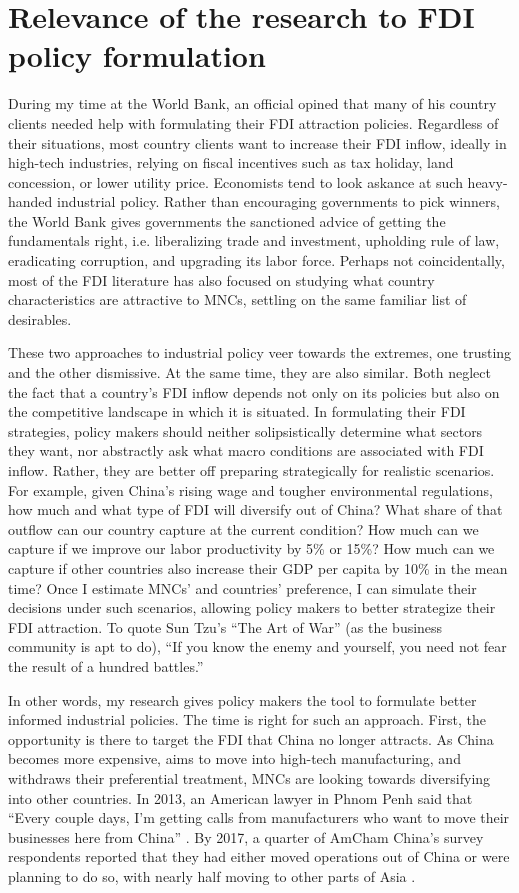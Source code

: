 \section{Relevance of the research to FDI policy formulation}

During my time at the World Bank, an official opined that many of his country
clients needed help with formulating their FDI attraction policies. Regardless
of their situations, most country clients want to increase their FDI inflow,
ideally in high-tech industries, relying on fiscal incentives such as tax
holiday, land concession, or lower utility price. Economists tend to look
askance at such heavy-handed industrial policy. Rather than encouraging
governments to pick winners, the World Bank gives governments the sanctioned
advice of getting the fundamentals right, i.e. liberalizing trade and
investment, upholding rule of law, eradicating corruption, and upgrading its
labor force. Perhaps not coincidentally, most of the FDI literature has also
focused on studying what country characteristics are attractive to MNCs,
settling on the same familiar list of desirables.

These two approaches to industrial policy veer towards the extremes, one
trusting and the other dismissive. At the same time, they are also similar. Both
neglect the fact that a country's FDI inflow depends not only on its policies
but also on the competitive landscape in which it is situated. In formulating their
FDI strategies, policy makers should neither solipsistically determine what
sectors they want, nor abstractly ask what macro conditions are associated with
FDI inflow. Rather, they are better off preparing strategically for realistic
scenarios. For example, given China's rising wage and tougher environmental
regulations, how much and what type of FDI will diversify out of China? What
share of that outflow can our country capture at the current condition? How much
can we capture if we improve our labor productivity by 5\% or 15\%? How much can
we capture if other countries also increase their GDP per capita by 10\% in the
mean time? Once I estimate MNCs' and countries' preference, I can simulate their
decisions under such scenarios, allowing policy makers to better strategize
their FDI attraction. To quote Sun Tzu's ``The Art of War'' (as the business
community is apt to do), ``If you know the enemy and yourself, you need not fear
the result of a hundred battles.''

In other words, my research gives policy makers the tool to formulate better
informed industrial policies. The time is right for such an approach. First, the
opportunity is there to target the FDI that China no longer attracts. As China
becomes more expensive, aims to move into high-tech manufacturing, and withdraws
their preferential treatment, MNCs are looking towards diversifying into other
countries. In 2013, an American lawyer in Phnom Penh said that ``Every couple
days, I'm getting calls from manufacturers who want to move their businesses
here from China'' \citep{Bradsher2013}. By 2017, a quarter of AmCham China's
survey respondents reported that they had either moved operations out of China
or were planning to do so, with nearly half moving to other parts of Asia
\citep{AmCham2018}.

